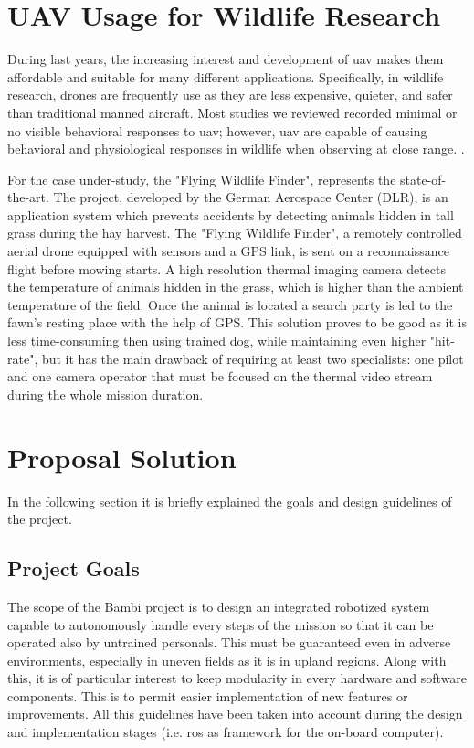 \section{UAV Usage for Wildlife Research} %
\label{sec:state_of_the_art}
 During last years, the increasing interest and development of \acrfull{uav} makes them affordable and suitable for many different applications. Specifically, in wildlife research, drones are frequently use as they are less expensive, quieter, and safer than traditional manned aircraft. Most studies we reviewed recorded minimal or no visible behavioral responses to \acrshort{uav}; however, \acrshort{uav} are capable of causing behavioral and physiological responses in wildlife when observing at close range. \cite{doi:10.1002/fee.1281}.\par
 For the case under-study, the "Flying Wildlife Finder", represents the state-of-the-art.
 The project, developed by the German Aerospace Center (DLR), is an application system which prevents accidents by detecting animals hidden in tall grass during the hay harvest. 
 The "Flying Wildlife Finder", a remotely controlled aerial drone equipped with sensors and a GPS link, is sent on a reconnaissance flight before mowing starts. A high resolution thermal imaging camera detects the temperature of animals hidden in the grass, which is higher than the ambient temperature of the field. Once the animal is located a search party is led to the fawn’s resting place with the help of GPS.
 This solution proves to be good as it is less time-consuming then using trained dog, while maintaining even higher "hit-rate", but it has the main drawback of requiring at least two specialists: one pilot and one camera operator that must be focused on the thermal video stream during the whole mission duration.

 
 
 \section{Proposal Solution} %
 \label{sec:proposal_solution}
 In the following section it is briefly explained the goals and design guidelines of the project.

 \subsection{Project Goals} %
 \label{sec:bambisaver_goals}
 The scope of the Bambi project is to design an integrated robotized system capable to autonomously handle every steps of the mission so that it can be operated also by untrained personals. This must be guaranteed even in adverse environments, especially in uneven fields as it is in upland regions. 
 Along with this, it is of particular interest to keep modularity in every hardware and software components. This is to permit easier implementation of new features or improvements.
 All this guidelines  have been taken into account during the design and implementation stages (i.e. \acrshort{ros} as framework for the on-board computer).

